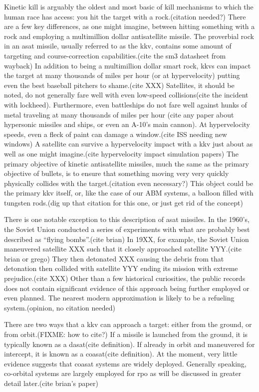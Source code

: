 Kinetic kill is arguably the oldest and most basic of kill mechanisms
to which the human race has access: you hit the target with a
rock.(citation needed?)  There are a few key differences, as one might
imagine, between hitting something with a rock and employing a
multimillion dollar antisatellite missile.  The proverbial rock in an
\ac{asat} missile, usually referred to as the \acf{kkv}, contains some
amount of targeting and course-correction capabilities.(cite the sm3
datasheet from wayback) In addition to being a multimillion dollar
smart rock, \acp{kkv} can impact the target at many thousands of miles
per hour (or at hypervelocity) putting even the best baseball pitchers
to shame.(cite XXX) Satellites, it should be noted, do not generally
fare well with even low-speed collisions(cite the incident with
lockheed).  Furthermore, even battleships do not fare well against
hunks of metal traveling at many thousands of miles per hour (cite any
paper about hypersonic missiles and ships, or even an A-10's main
cannon).  At hypervelocity speeds, even a fleck of paint can damage a
window.(cite ISS needing new windows) A satellite can survive a
hypervelocity impact with a \ac{kkv} just about as well as one might
imagine.(cite hypervelocity impact simulation papers) The primary
objective of kinetic antisatellite missiles, much the same as the
primary objective of bullets, is to ensure that something moving very
very quickly physically collides with the target.(citation even
necessary?) This object could be the primary \ac{kkv} itself, or, like
the case of our ABM systems, a balloon filled with tungsten rods.(dig
up that citation for this one, or just get rid of the concept)

There is one notable exception to this description of \ac{asat}
missiles.  In the 1960's, the Soviet Union conducted a series of
experiments with what are probably best described as ``flying
bombs''.(cite brian) In 19XX, for example, the Soviet Union maneuvered
satellite XXX such that it closely approached satellite YYY.(cite
brian or grego) They then detonated XXX causing the debris from that
detonation then collided with satellite YYY ending its mission with
extreme prejudice.(cite XXX) Other than a few historical curiosities,
the public records does not contain significant evidence of this
approach being further employed or even planned.  The nearest modern
approximation is likely to be a refueling system.(opinion, no citation
needed)

There are two ways that a \ac{kkv} can approach a target: either from
the ground, or from orbit.(FIXME: how to cite?)  If a missile is
launched from the ground, it is typically known as a \acf{dasat}(cite
definition).  If already in orbit and maneuvered for intercept, it is
known as a \acf{coasat}(cite definition).  At the moment, very little
evidence suggests that \ac{coasat} systems are widely deployed.
Generally speaking, co-orbital systems are largely employed for
\acf{rpo} as will be discussed in greater detail later.(cite brian's
paper)

